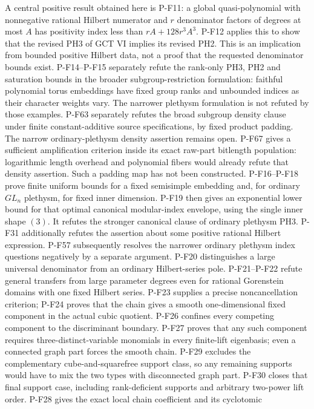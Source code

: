 A central positive result obtained here is P-F11: a global
quasi-polynomial with nonnegative rational Hilbert numerator and
$r$ denominator factors of degrees at most $A$ has positivity index
less than $rA+128r^3A^3$. P-F12 applies this to show that the revised
PH3 of GCT VI implies its revised PH2. This is an implication from
bounded positive Hilbert data, not a proof that the requested
denominator bounds exist.
P-F14--P-F15 separately refute the rank-only PH3, PH2 and saturation
bounds in the broader subgroup-restriction formulation: faithful
polynomial torus embeddings have fixed group ranks and unbounded
indices as their character weights vary. The narrower plethysm
formulation is not refuted by those examples. P-F63 separately
refutes the broad subgroup density clause under finite
constant-additive source specifications, by fixed product padding.
The narrow ordinary-plethysm density assertion remains open.
P-F67 gives a sufficient amplification criterion inside its exact
raw-part bitlength population: logarithmic length overhead and
polynomial fibers would already refute that density assertion.
Such a padding map has not been constructed.
P-F16--P-F18 prove finite uniform bounds for a fixed semisimple
embedding and, for ordinary $GL_n$ plethysm, for fixed inner dimension.
P-F19 then gives an exponential lower bound for that optimal canonical
modular-index envelope, using the single inner shape $(3)$.
It refutes the stronger canonical clause of ordinary plethysm PH3.
P-F31 additionally refutes the assertion about some positive rational
Hilbert expression. P-F57 subsequently resolves the narrower
ordinary plethysm index questions negatively by a separate argument.
P-F20 distinguishes a large universal denominator from an ordinary
Hilbert-series pole. P-F21--P-F22 refute general transfers from large
parameter degrees even for rational Gorenstein domains with one fixed
Hilbert series. P-F23 supplies a precise noncancellation criterion;
P-F24 proves that the chain gives a smooth one-dimensional fixed
component in the actual cubic quotient. P-F26 confines every competing component
to the discriminant boundary. P-F27 proves that any such component
requires three-distinct-variable monomials in every finite-lift
eigenbasis; even a connected graph part forces the smooth chain.
P-F29 excludes the complementary cube-and-squarefree support class,
so any remaining supports would have to mix the two types with
disconnected graph part. P-F30 closes that final support case,
including rank-deficient supports and arbitrary two-power lift order.
P-F28 gives the exact local chain coefficient and its cyclotomic
